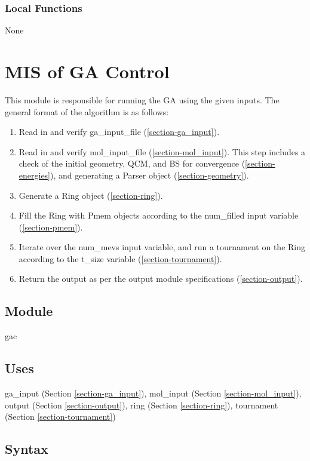 \documentclass[12pt, titlepage]{article}
\begin{document}
\subsubsection{Local Functions}

None

\newpage

\section{MIS of GA Control} \label{section-gac} 

This module is responsible for running the GA using the given inputs. The 
general format of the algorithm is as follows:
\begin{enumerate}
	\item Read in and verify ga\_input\_file (\ref{section-ga_input}).
	\item Read in and verify mol\_input\_file (\ref{section-mol_input}). This 
	step includes a check of the initial geometry, QCM, and BS for convergence 
	(\ref{section-energies}), and generating a Parser object 
	(\ref{section-geometry}).
	\item Generate a Ring object (\ref{section-ring}).
	\item Fill the Ring with Pmem objects according to the num\_filled input 
	variable (\ref{section-pmem}).
	\item Iterate over the num\_mevs input variable, and run a tournament on 
	the Ring according to the t\_size variable (\ref{section-tournament}).
	\item Return the output as per the output module specifications 
	(\ref{section-output}).
\end{enumerate}

\subsection{Module}

gac

\subsection{Uses}

ga\_input (Section \ref{section-ga_input}), 
mol\_input (Section \ref{section-mol_input}),
output (Section \ref{section-output}),
ring (Section \ref{section-ring}),
tournament (Section \ref{section-tournament})

\subsection{Syntax}
\end{document}

